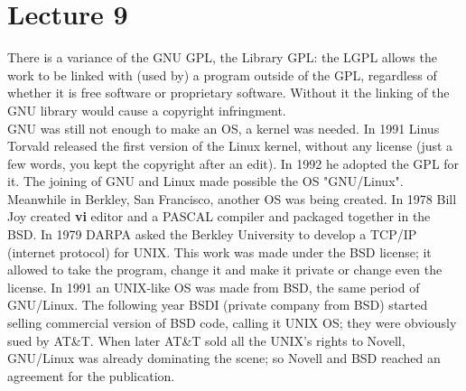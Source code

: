 \documentclass[a4paper, 10pt, titlepage]{article}
\begin{document}
\section{Lecture 9}
There is a variance of the GNU GPL, the Library GPL: the LGPL allows the work to be linked with (used by) a program outside of the GPL, regardless of whether it is free software or proprietary software. Without it the linking of the GNU library would cause a copyright infringment. \medskip \\
GNU was still not enough to make an OS, a kernel was needed. In 1991 Linus Torvald released the first version of the Linux kernel, without any license (just a few words, you kept the copyright after an edit). In 1992 he adopted the GPL for it.
The joining of GNU and Linux made possible the OS "GNU/Linux". \medskip \\
Meanwhile in Berkley, San Francisco, another OS was being created. In 1978 Bill Joy created \textbf{vi} editor and a PASCAL compiler and packaged together in the BSD. In 1979 DARPA asked the Berkley University to develop a TCP/IP (internet protocol) for UNIX. This work was made under the BSD license; it allowed to take the program, change it and make it private or change even the license. In 1991 an UNIX-like OS was made from BSD, the same period of GNU/Linux. The following year BSDI (private company from BSD) started selling commercial version of BSD code, calling it UNIX OS; they were obviously sued by AT\&T. When later AT\&T sold all the UNIX's rights to Novell, GNU/Linux was already dominating the scene; so Novell and BSD reached an agreement for the publication.
\end{document}
